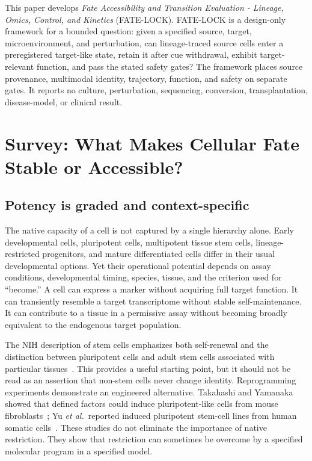 \documentclass[10pt,conference]{IEEEtran}
\begin{document}
This paper develops \emph{Fate Accessibility and Transition Evaluation - Lineage, Omics, Control, and Kinetics} (FATE-LOCK). FATE-LOCK is a design-only framework for a bounded question: given a specified source, target, microenvironment, and perturbation, can lineage-traced source cells enter a preregistered target-like state, retain it after cue withdrawal, exhibit target-relevant function, and pass the stated safety gates? The framework places source provenance, multimodal identity, trajectory, function, and safety on separate gates. It reports no culture, perturbation, sequencing, conversion, transplantation, disease-model, or clinical result.

\section{Survey: What Makes Cellular Fate Stable or Accessible?}
\label{sec:survey}

\subsection{Potency is graded and context-specific}

The native capacity of a cell is not captured by a single hierarchy alone. Early developmental cells, pluripotent cells, multipotent tissue stem cells, lineage-restricted progenitors, and mature differentiated cells differ in their usual developmental options. Yet their operational potential depends on assay conditions, developmental timing, species, tissue, and the criterion used for ``become.'' A cell can express a marker without acquiring full target function. It can transiently resemble a target transcriptome without stable self-maintenance. It can contribute to a tissue in a permissive assay without becoming broadly equivalent to the endogenous target population.

The NIH description of stem cells emphasizes both self-renewal and the distinction between pluripotent cells and adult stem cells associated with particular tissues~\cite{nihstem}. This provides a useful starting point, but it should not be read as an assertion that non-stem cells never change identity. Reprogramming experiments demonstrate an engineered alternative. Takahashi and Yamanaka showed that defined factors could induce pluripotent-like cells from mouse fibroblasts~\cite{takahashi2006}; Yu \emph{et al.}\ reported induced pluripotent stem-cell lines from human somatic cells~\cite{yu2007}. These studies do not eliminate the importance of native restriction. They show that restriction can sometimes be overcome by a specified molecular program in a specified model.
\end{document}
